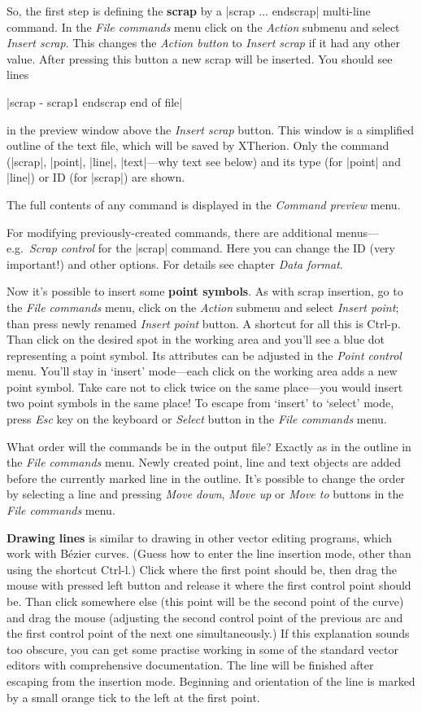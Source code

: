 So, the first step is defining the {\bf scrap} by a |scrap ... endscrap| 
multi-line command.  In the {\it File commands} menu click on the {\it Action} 
submenu and select {\it Insert scrap}. This changes the {\it Action button} to
{\it Insert scrap} if it had any other value. After pressing this button a 
new scrap will be inserted. You should see lines

|scrap - scrap1
endscrap
end of file|

in the preview window above the {\it Insert scrap} button. This window is a 
simplified outline of the text file, which will be saved by XTherion. Only 
the command (|scrap|, |point|, |line|, |text|---why text see below) and its 
type (for |point| and |line|) or ID (for |scrap|) are shown. 

The full contents of any command is displayed in the {\it Command preview} 
menu.

For modifying previously-created commands, there are additional 
menus---e.g.~{\it Scrap control} for the |scrap| command. Here you can 
change the ID (very important!) and other options. 
For details see chapter {\it Data format}.

Now it's possible to insert some {\bf point symbols}. As with scrap 
insertion, go to the {\it File commands} menu, click on the {\it Action} 
submenu and select {\it Insert point}; than press newly renamed {\it Insert 
point} button. A shortcut for all this is Ctrl-p. Than click on the desired 
spot in the working area and you'll see a blue dot representing a point 
symbol. Its attributes can be adjusted in the {\it Point control} menu.
You'll stay in `insert' mode---each click on the working area adds a new 
point symbol. Take care not to click twice on the same place---you would insert 
two point symbols in the same place!
To escape from `insert' to `select' mode, press {\it Esc} key 
on the keyboard or {\it Select} button in the {\it File commands} menu.

What order will the commands be in the output file? Exactly as in the 
outline in the {\it File commands} menu. Newly created point, line and text objects 
are added before the currently marked line in the outline. It's possible to 
change the order by selecting a line and pressing {\it Move down}, 
{\it Move up} or {\it Move to} buttons in the {\it File commands} menu.

{\bf Drawing lines} is similar to drawing in other 
vector editing programs, which work with B\'ezier curves. 
(Guess how to enter the line insertion mode, other than 
using the shortcut Ctrl-l.) Click where the first point should be, then drag the 
mouse with pressed left button and release it where the first control point 
should be. Than click somewhere else (this point will be the second point of 
the curve) and drag the mouse (adjusting the second control point of the 
previous arc and the first control point of the next one simultaneously.) If 
this explanation sounds too obscure, you can 
get some practise working in some of the standard vector editors with 
comprehensive documentation. The line will be finished after escaping from the 
insertion mode. Beginning and orientation of the line is marked by a small 
orange tick to the left at the first point.

